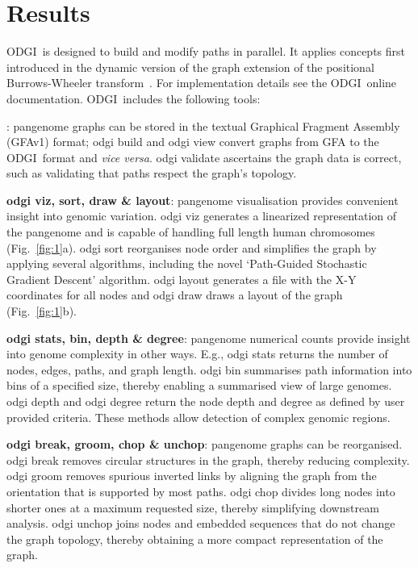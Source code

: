 \documentclass{bioinfo}
\newcommand{\odgi}{ODGI}
\newcommand{\cmd}[1]{{\scriptsize\textrm{#1}}}
\newcommand{\cmdbf}[1]{{\textbf{#1}}}
\newcommand{\topic}[1]{{\cmdbf{#1}}:}
\begin{document}
    \vspace{-0.1in}

    


    \section{Results}

    \odgi\ is designed to build and modify paths in parallel. It
    applies concepts first introduced in the dynamic version of the
    graph extension of the positional Burrows-Wheeler
    transform~\citep{Siren:2020}. For implementation details see the
    \odgi\ online documentation. \odgi\ includes the following tools:

    \indent \topic{odgi build, view \& validate} pangenome graphs can be
    stored in the textual Graphical Fragment Assembly
    (GFAv1) format\citep{GFA}; \cmd{odgi build} and \cmd{odgi view}
    convert graphs from GFA to the \odgi\ format and \textit{vice versa}.
    \cmd{odgi validate} ascertains the graph data is correct, such as
    validating that paths respect the graph's topology.

    \topic{odgi viz, sort, draw \& layout} pangenome visualisation
    provides convenient insight into genomic variation. \cmd{odgi viz}
    generates a linearized representation of the pangenome and is
    capable of handling full length human chromosomes
    (Fig.~\ref{fig:1}a). \cmd{odgi sort} reorganises node order and
    simplifies the graph by applying several algorithms, including the
    novel `Path-Guided Stochastic Gradient Descent' algorithm.
    \cmd{odgi layout} generates a file with the X-Y coordinates for
    all nodes and \cmd{odgi draw} draws a layout of the graph
    (Fig.~\ref{fig:1}b).

    \topic{odgi stats, bin, depth \& degree} pangenome numerical
    counts provide insight into genome complexity in other
    ways. E.g., \cmd{odgi stats} returns the number of nodes,
    edges, paths, and graph length. \cmd{odgi bin} summarises path
    information into bins of a specified size, thereby enabling a
    summarised view of large genomes. \cmd{odgi depth} and
    \cmd{odgi degree} return the node depth and degree as defined by
    user provided criteria. These methods allow detection of complex
    genomic regions.

    \topic{odgi break, groom, chop \& unchop} pangenome graphs can be
    reorganised.  \cmd{odgi break} removes circular structures in the
    graph, thereby reducing complexity. \cmd{odgi groom} removes
    spurious inverted links by aligning the graph from the orientation
    that is supported by most paths. \cmd{odgi chop} divides long
    nodes into shorter ones at a maximum requested size, thereby
    simplifying downstream analysis.  \cmd{odgi unchop} joins nodes
    and embedded sequences that do not change the graph topology,
    thereby obtaining a more compact representation of the graph.
\end{document}
